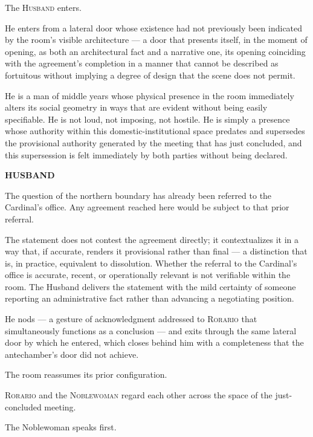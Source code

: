 \documentclass[12pt, oneside]{article}
\newenvironment{action}{%
  \vspace{0.6em}%
  \noindent\ignorespaces%
}{%
  \par\vspace{0.6em}%
}
\newcommand{\character}[1]{%
  \vspace{0.8em}%
  \begin{center}%
    \bfseries\MakeUppercase{#1}%
  \end{center}%
  \vspace{-0.3em}%
}
\newenvironment{dialogue}{%
  \vspace{0.2em}%
  \begin{list}{}{%
    \setlength{\leftmargin}{1.2in}%
    \setlength{\rightmargin}{0.8in}%
    \setlength{\itemsep}{0.6em}%
    \setlength{\parsep}{0pt}%
  }%
}{%
  \end{list}%
  \vspace{0.4em}%
}
\newcommand{\says}[2]{%
  \character{#1}%
  \begin{dialogue}\item #2\end{dialogue}%
}
\begin{document}
\begin{action}
The \textsc{Husband} enters.

He enters from a lateral door whose existence had not previously been indicated by the room's visible architecture --- a door that presents itself, in the moment of opening, as both an architectural fact and a narrative one, its opening coinciding with the agreement's completion in a manner that cannot be described as fortuitous without implying a degree of design that the scene does not permit.

He is a man of middle years whose physical presence in the room immediately alters its social geometry in ways that are evident without being easily specifiable. He is not loud, not imposing, not hostile. He is simply a presence whose authority within this domestic-institutional space predates and supersedes the provisional authority generated by the meeting that has just concluded, and this supersession is felt immediately by both parties without being declared.
\end{action}

\says{Husband}{The question of the northern boundary has already been referred to the Cardinal's office. Any agreement reached here would be subject to that prior referral.}

\begin{action}
The statement does not contest the agreement directly; it contextualizes it in a way that, if accurate, renders it provisional rather than final --- a distinction that is, in practice, equivalent to dissolution. Whether the referral to the Cardinal's office is accurate, recent, or operationally relevant is not verifiable within the room. The Husband delivers the statement with the mild certainty of someone reporting an administrative fact rather than advancing a negotiating position.

He nods --- a gesture of acknowledgment addressed to \textsc{Rorario} that simultaneously functions as a conclusion --- and exits through the same lateral door by which he entered, which closes behind him with a completeness that the antechamber's door did not achieve.

The room reassumes its prior configuration.
\end{action}

\begin{action}
\textsc{Rorario} and the \textsc{Noblewoman} regard each other across the space of the just-concluded meeting.

The Noblewoman speaks first.
\end{action}
\end{document}
